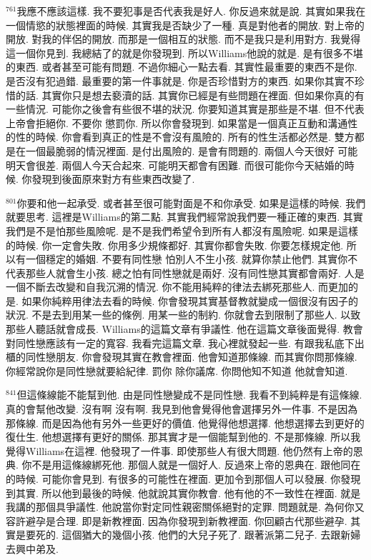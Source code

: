 \documentclass{book}
\begin{document}
$^{761}$我應不應該這樣.
我不要犯事是否代表我是好人.
你反過來就是說.
其實如果我在一個情慾的狀態裡面的時候.
其實我是否缺少了一種.
真是對他者的開放.
對上帝的開放.
對我的伴侶的開放.
而那是一個相互的狀態.
而不是我只是利用對方.
我覺得這一個你見到.
我總結了的就是你發現到.
所以Williams他說的就是.
是有很多不堪的東西.
或者甚至可能有問題.
不過你細心一點去看.
其實性最重要的東西不是你.
是否沒有犯過錯.
最重要的第一件事就是.
你是否珍惜對方的東西.
如果你其實不珍惜的話.
其實你只是想去褻瀆的話.
其實你已經是有些問題在裡面.
但如果你真的有一些情況.
可能你之後會有些很不堪的狀況.
你要知道其實是那些是不堪.
但不代表上帝會拒絕你.
不要你 懲罰你.
所以你會發現到.
如果當是一個真正互動和溝通性的性的時候.
你會看到真正的性是不會沒有風險的.
所有的性生活都必然是.
雙方都是在一個最脆弱的情況裡面.
是付出風險的.
是會有問題的.
兩個人今天很好 可能明天會很差.
兩個人今天合起來.
可能明天都會有困難.
而很可能你今天結婚的時候.
你發現到後面原來對方有些東西改變了.

$^{801}$你要和他一起承受.
或者甚至很可能對面是不和你承受.
如果是這樣的時候.
我們就要思考.
這裡是Williams的第二點.
其實我們經常說我們要一種正確的東西.
其實我們是不是怕那些風險呢.
是不是我們希望令到所有人都沒有風險呢.
如果是這樣的時候.
你一定會失敗.
你用多少規條都好.
其實你都會失敗.
你要怎樣規定他.
所以有一個穩定的婚姻.
不要有同性戀 怕別人不生小孩.
就算你禁止他們.
其實你不代表那些人就會生小孩.
總之怕有同性戀就是兩好.
沒有同性戀其實都會兩好.
人是一個不斷去改變和自我沉溯的情況.
你不能用純粹的律法去綁死那些人.
而更加的是.
如果你純粹用律法去看的時候.
你會發現其實基督教就變成一個很沒有因子的狀況.
不是去到用某一些的條例.
用某一些的制約.
你就會去到限制了那些人.
以致那些人聽話就會成長.
Williams的這篇文章有爭議性.
他在這篇文章後面覺得.
教會對同性戀應該有一定的寬容.
我看完這篇文章.
我心裡就發起一些.
有跟我私底下出櫃的同性戀朋友.
你會發現其實在教會裡面.
他會知道那條線.
而其實你問那條線.
你經常說你是同性戀就要給紀律.
罰你 除你議席.
你問他知不知道 他就會知道.

$^{841}$但這條線能不能幫到他.
由是同性戀變成不是同性戀.
我看不到純粹是有這條線.
真的會幫他改變.
沒有啊 沒有啊.
我見到他會覺得他會選擇另外一件事.
不是因為那條線.
而是因為他有另外一些更好的價值.
他覺得他想選擇.
他想選擇去到更好的復仕生.
他想選擇有更好的關係.
那其實才是一個能幫到他的.
不是那條線.
所以我覺得Williams在這裡.
他發現了一件事.
即使那些人有很大問題.
他仍然有上帝的恩典.
你不是用這條線綁死他.
那個人就是一個好人.
反過來上帝的恩典在.
跟他同在的時候.
可能你會見到.
有很多的可能性在裡面.
更加令到那個人可以發展.
你發現到其實.
所以他到最後的時候.
他就說其實你教會.
他有他的不一致性在裡面.
就是我講的那個具爭議性.
他說當你對定同性親密關係絕對的定罪.
問題就是.
為何你又容許避孕是合理.
即是新教裡面.
因為你發現到新教裡面.
你回顧古代那些避孕.
其實是要死的.
這個猶大的幾個小孩.
他們的大兒子死了.
跟著派第二兒子.
去跟新婦去興中弟及.
\end{document}
